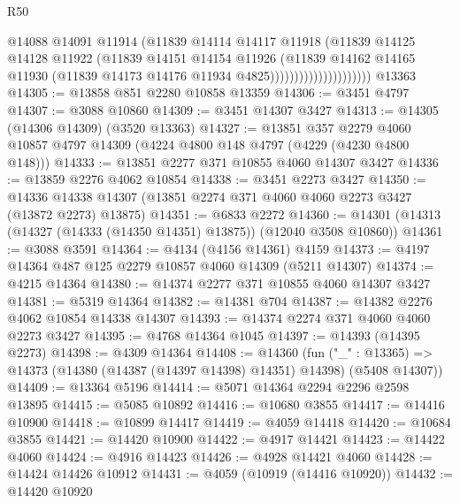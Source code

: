 \begin{lexlean}{R50}
\begin{coremodule}
                                    @14088
                                    @14091
                                    @11914
                                    (@11839
                                      @14114
                                      @14117
                                      @11918
                                      (@11839
                                        @14125
                                        @14128
                                        @11922
                                        (@11839
                                          @14151
                                          @14154
                                          @11926
                                          (@11839
                                            @14162
                                            @14165
                                            @11930
                                            (@11839 @14173 @14176 @11934 @4825)))))))))))))))))))))
    @13363
@14305 := @13858 @851 @2280 @10858 @13359
@14306 := @3451 @4797
@14307 := @3088 @10860
@14309 := @3451 @14307 @3427
@14313 := @14305 (@14306 @14309) (@3520 @13363)
@14327 := @13851
    @357
    @2279
    @4060
    @10857
    @4797
    @14309
    (@4224 @4800 @148 @4797 (@4229 (@4230 @4800 @148)))
@14333 := @13851 @2277 @371 @10855 @4060 @14307 @3427
@14336 := @13859 @2276 @4062 @10854
@14338 := @3451 @2273 @3427
@14350 := @14336 @14338 @14307 (@13851 @2274 @371 @4060 @4060 @2273 @3427 (@13872 @2273) @13875)
@14351 := @6833 @2272
@14360 := @14301 (@14313 (@14327 (@14333 (@14350 @14351) @13875)) (@12040 @3508 @10860))
@14361 := @3088 @3591
@14364 := @4134 (@4156 @14361) @4159
@14373 := @4197 @14364 @487 @125 @2279 @10857 @4060 @14309 (@5211 @14307)
@14374 := @4215 @14364
@14380 := @14374 @2277 @371 @10855 @4060 @14307 @3427
@14381 := @5319 @14364
@14382 := @14381 @704
@14387 := @14382 @2276 @4062 @10854 @14338 @14307
@14393 := @14374 @2274 @371 @4060 @4060 @2273 @3427
@14395 := @4768 @14364 @1045
@14397 := @14393 (@14395 @2273)
@14398 := @4309 @14364
@14408 := @14360
    (fun ("_" : @13365) => @14373 (@14380 (@14387 (@14397 @14398) @14351) @14398) (@5408 @14307))
@14409 := @13364 @5196
@14414 := @5071 @14364 @2294 @2296 @2598 @13895
@14415 := @5085 @10892
@14416 := @10680 @3855
@14417 := @14416 @10900
@14418 := @10899 @14417
@14419 := @4059 @14418
@14420 := @10684 @3855
@14421 := @14420 @10900
@14422 := @4917 @14421
@14423 := @14422 @4060
@14424 := @4916 @14423
@14426 := @4928 @14421 @4060
@14428 := @14424 @14426 @10912
@14431 := @4059 (@10919 (@14416 @10920))
@14432 := @14420 @10920

\end{coremodule}
\end{lexlean}
